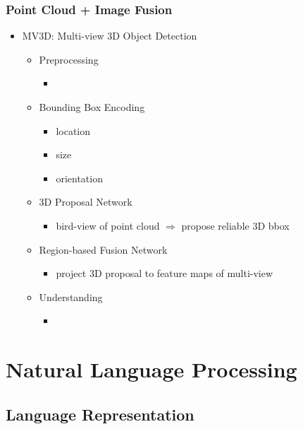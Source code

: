 \subsubsection{Point Cloud + Image Fusion}
\begin{itemize}
\item MV3D: Multi-view 3D Object Detection
	\begin{itemize}
	\item Preprocessing
		\begin{itemize}
		\item 
		\end{itemize}
	\item Bounding Box Encoding
		\begin{itemize}
		\item location
		\item size
		\item orientation
		\end{itemize}
	\item 3D Proposal Network
		\begin{itemize}
		\item bird-view of point cloud $\Rightarrow$ propose reliable 3D bbox
		\end{itemize}
	\item Region-based Fusion Network
		\begin{itemize}
		\item project 3D proposal to feature maps of multi-view
		\end{itemize}
	\item Understanding
		\begin{itemize}
		\item 
		\end{itemize}
	\end{itemize}
\end{itemize}

\section{Natural Language Processing}
\subsection{Language Representation} \label{DL_NLP_Langrep}
